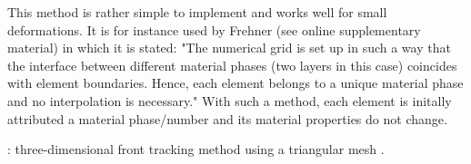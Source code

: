 This method is rather simple to implement and works well for small deformations. It is 
for instance used by Frehner \cite{freh14} (see online supplementary material) in which it is 
stated: "The numerical grid is set up in such a way that the interface
between different material phases (two layers in this case) coincides with element boundaries. Hence, each
element belongs to a unique material phase and no interpolation is necessary."
With such a method, each element is initally attributed a material phase/number and its material
properties do not change. 


\vspace{2cm} 

\Literature: three-dimensional front tracking method using a triangular mesh \cite{sclo03}.




